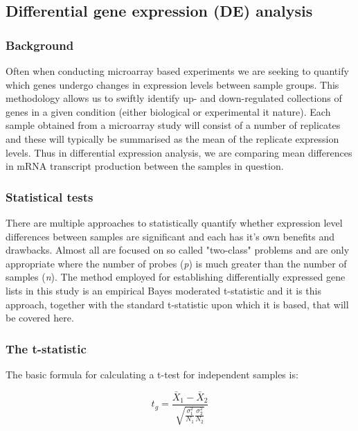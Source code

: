 \subsection{Differential gene expression (DE) analysis}

\subsubsection{Background}

Often when conducting microarray based experiments we are seeking to quantify which genes undergo changes in expression levels between sample groups. This methodology allows us to swiftly identify up- and down-regulated collections of genes in a given condition (either biological or experimental it nature). Each sample obtained from a microarray study will consist of a number of replicates and these will typically be summarised as the mean of the replicate expression levels. Thus in differential expression analysis, we are comparing mean differences in mRNA transcript production between the samples in question. 

\subsubsection{Statistical tests}

There are multiple approaches to statistically quantify whether expression level differences between samples are significant and each has it's own benefits and drawbacks. Almost all are focused on so called "two-class" problems and are only appropriate where the number of probes (\textit{p}) is much greater than the number of samples (\textit{n}). The method employed for establishing differentially expressed gene lists in this study is an empirical Bayes moderated t-statistic and it is this approach, together with the standard t-statistic upon which it is based, that will be covered here. 

\subsubsection{The t-statistic}

The basic formula for calculating a t-test for independent samples is:

\begin{equation}
t_g = \frac{\bar{X}_1 - \bar{X}_2} {\sqrt{\frac{\sigma^2_1}{N_1}\frac{\sigma^2_2}{N_2}}} \label{t-statistic}
\end{equation}

